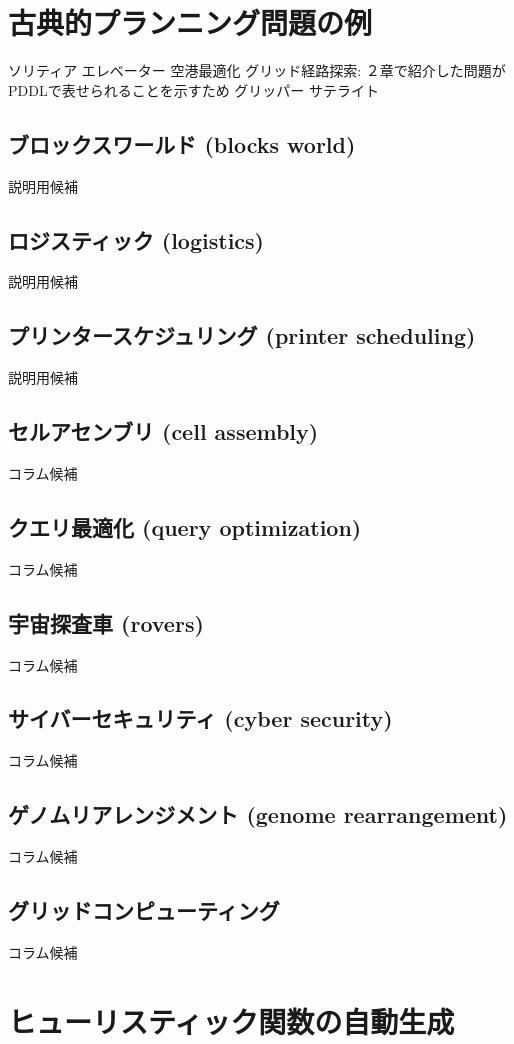 \documentclass[b5paper]{report}
\begin{document}
\section{古典的プランニング問題の例}
\label{sec:classical-planning-example}
ソリティア
エレベーター
空港最適化
グリッド経路探索: ２章で紹介した問題がPDDLで表せられることを示すため
グリッパー
サテライト


\subsection{ブロックスワールド (blocks world)}
説明用候補
\subsection{ロジスティック (logistics)}
説明用候補
\subsection{プリンタースケジュリング (printer scheduling)}
説明用候補

\subsection{セルアセンブリ (cell assembly)}
コラム候補
\subsection{クエリ最適化 (query optimization)}
コラム候補
\subsection{宇宙探査車 (rovers)}
コラム候補
\subsection{サイバーセキュリティ (cyber security)}
コラム候補
\subsection{ゲノムリアレンジメント (genome rearrangement)}
コラム候補
\subsection{グリッドコンピューティング}
コラム候補


\section{ヒューリスティック関数の自動生成}
\label{sec:automated-heuristic}
\end{document}
